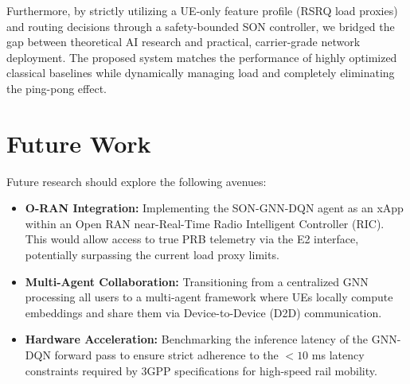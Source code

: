 \documentclass[12pt,a4paper,oneside]{report}
\begin{document}
Furthermore, by strictly utilizing a UE-only feature profile (RSRQ load proxies) and routing decisions through a safety-bounded SON controller, we bridged the gap between theoretical AI research and practical, carrier-grade network deployment. The proposed system matches the performance of highly optimized classical baselines while dynamically managing load and completely eliminating the ping-pong effect.

\section{Future Work}
Future research should explore the following avenues:
\begin{itemize}
    \item \textbf{O-RAN Integration:} Implementing the SON-GNN-DQN agent as an xApp within an Open RAN near-Real-Time Radio Intelligent Controller (RIC). This would allow access to true PRB telemetry via the E2 interface, potentially surpassing the current load proxy limits.
    \item \textbf{Multi-Agent Collaboration:} Transitioning from a centralized GNN processing all users to a multi-agent framework where UEs locally compute embeddings and share them via Device-to-Device (D2D) communication.
    \item \textbf{Hardware Acceleration:} Benchmarking the inference latency of the GNN-DQN forward pass to ensure strict adherence to the $<10$ ms latency constraints required by 3GPP specifications for high-speed rail mobility.
\end{itemize}
\end{document}
